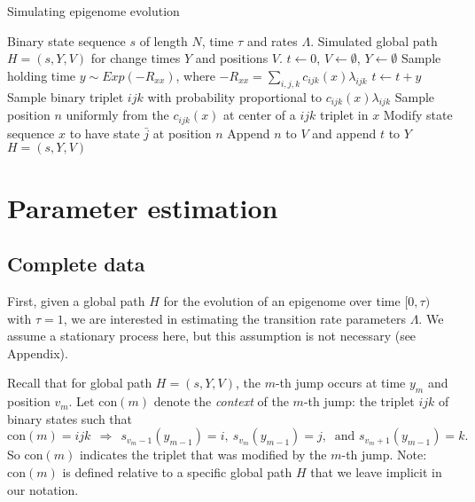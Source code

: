 \documentclass[11pt]{article}
\newcommand{\context}[1]{\ensuremath{\mathrm{con}(#1)}}
\newcommand\halfopen[2]{\ensuremath{[#1,#2)}}
\begin{document}
\begin{algorithm}[t]
  \begin{algorithmic}[1]
    \caption{Simulating epigenome evolution}\label{alg:simulation}
    \REQUIRE Binary state sequence $s$ of length $N$, time $\tau$ and rates $\Lambda$.
    \ENSURE Simulated global path $H = (s, Y, V)$ for change times $Y$ and positions $V$.
    \STATE $t \gets 0$, $V\gets\emptyset$, $Y\gets\emptyset$
    \STATE Sample holding time $y\sim \mathit{Exp}(-R_{xx})$, where $-R_{xx} = \sum_{i,j,k}c_{ijk}(x)\lambda_{ijk}$
    \STATE $t \gets t + y$
    \STATE Sample binary triplet $ijk$ with probability proportional to $c_{ijk}(x)\lambda_{ijk}$
    \STATE Sample position $n$ uniformly from the $c_{ijk}(x)$ at center of a $ijk$ triplet in $x$
    \STATE Modify state sequence $x$ to have state $\bar{j}$ at position $n$
    \STATE Append $n$ to $V$ and append $t$ to $Y$
    \ENDIF
    \ENDWHILE
    \RETURN $H = (s, Y, V)$
  \end{algorithmic}
\end{algorithm}



\section{Parameter estimation}

\subsection{Complete data}

First, given a global path $H$ for the evolution of an epigenome over
time $\halfopen{0}{\tau}$ with $\tau = 1$, we are interested in
estimating the transition rate parameters $\Lambda$.
We assume a stationary process here, but this assumption is not
necessary (see Appendix).

Recall that for global path $H = (s, Y, V)$, the $m$-th jump occurs at
time $y_m$ and position $v_m$. Let $\context{m}$ denote the
\textit{context} of the $m$-th jump: the triplet $ijk$ of binary
states such that
\[
\context{m} = ijk ~~ \Rightarrow ~~ s_{v_m-1}(y_{m-1}) = i, ~ s_{v_m}(y_{m-1}) = j, ~ \mbox{ and } s_{v_m+1}(y_{m-1}) = k.
\]
So $\context{m}$ indicates the triplet that was modified by the $m$-th
jump. Note: $\context{m}$ is defined relative to a specific global
path $H$ that we leave implicit in our notation.
\end{document}
